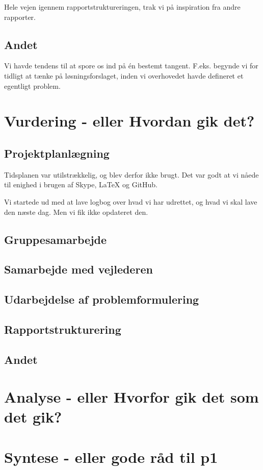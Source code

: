 Hele vejen igennem rapportstruktureringen, trak vi på inspiration fra andre rapporter.

\subsection{Andet}


Vi havde tendens til at spore os ind på én bestemt tangent. F.eks. begynde vi for tidligt at tænke på løsningsforslaget, inden vi overhovedet havde defineret et egentligt problem.



\section{Vurdering - eller Hvordan gik det?}

\subsection{Projektplanlægning}

Tidsplanen var utilstrækkelig, og blev derfor ikke brugt. Det var godt at vi nåede til enighed i brugen af Skype, LaTeX og GitHub.

Vi startede ud med at lave logbog over hvad vi har udrettet, og hvad vi skal lave den næste dag. Men vi fik ikke opdateret den.

\subsection{Gruppesamarbejde}




\subsection{Samarbejde med vejlederen}

\subsection{Udarbejdelse af problemformulering}



\subsection{Rapportstrukturering}

\subsection{Andet}

\section{Analyse - eller Hvorfor gik det som det gik?}



\section{Syntese - eller gode råd til p1}








